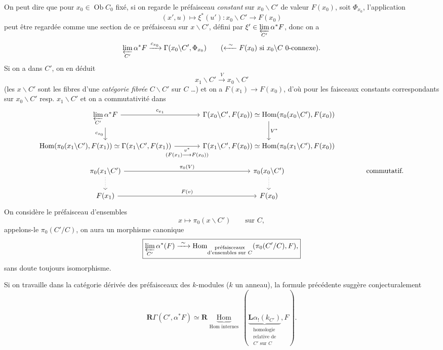 On peut dire que pour $x_0 \in \operatorname{Ob} C_0$ fixé, si on regarde le préfaisceau \textit{constant} sur $x_0\backslash C'$ de valeur $F(x_0)$, soit $\Phi_{x_0}$, l'application
\[ (x',u) \longmapsto \xi^*(u') : x_0\backslash C' \longrightarrow F(x_0) \]
peut être regardée comme une section de ce préfaisceau sur $x\backslash C'$, défini par $\xi' \in \varprojlim\limits_{C'} \alpha^*F$, donc on a
\[ \varprojlim_{C'} \alpha^*F \xrightarrow{c_{x_0}} \Gamma(x_0\backslash C', \Phi_{x_0}) \qquad (\xleftarrow{\ \sim\ } F(x_0) \text{ si } x_0\backslash C \text{ 0-connexe}). \]
Si on a  dans $C'$, on en déduit
\[ x_1\backslash C' \xrightarrow{V} x_0\backslash C' \]
(les $x\backslash C'$ sont les fibres d'une \textit{catégorie fibrée} $C\backslash C'$ sur $C$ \dots) et on a $F(x_1) \longrightarrow F(x_0)$, d'où  pour les faisceaux constants correspondants sur $x_0\backslash C'$ resp. $x_1\backslash C'$
et on a commutativité dans
\[
\begin{tikzcd}[column sep=large]
\varprojlim\limits_{C'} \alpha^*F \arrow[r, "c_{x_1}"] \arrow[d, "c_{x_0}"'] & \Gamma(x_0\backslash C', F(x_0)) \simeq \operatorname{Hom}(\pi_0(x_0\backslash C'), F(x_0)) \arrow[d, "V^*"] & \\
\operatorname{Hom}(\pi_0(x_1\backslash C'), F(x_1)) \simeq \Gamma(x_1\backslash C', F(x_1)) \arrow[r, "\substack{v^*\\ (F(x_1) \longrightarrow F(x_0))}"'] & \Gamma(x_1\backslash C', F(x_0)) \simeq \operatorname{Hom}(\pi_0(x_1\backslash C'), F(x_0)) & \\
\pi_0(x_1\backslash C') \arrow[r, "\pi_0(V)"] \arrow[d, dotted] & \pi_0(x_0\backslash C') \arrow[d, dotted] & \text{commutatif.} \\
F(x_1) \arrow[r, "F(v)"] & F(x_0) &
\end{tikzcd}
\]
On considère le préfaisceau d'ensembles
\[ x \longmapsto \pi_0(x\backslash C') \qquad \text{sur } C, \]
appelons-le $\pi_0(C'/C)$, on aura un morphisme canonique
\[ \boxed{\varprojlim_{C'} \alpha^*(F) \xrightarrow{\ \sim\ } \operatorname{Hom}_{\substack{\text{préfaisceaux}\\ \text{d'ensembles sur $C$}}} (\pi_0(C'/C), F),} \]
sans doute toujours isomorphisme.

Si on travaille dans la catégorie dérivée des préfaisceaux des $k$-modules ($k$ un anneau), la formule précédente suggère conjecturalement
\[ \boxed{\mathbf{R}\Gamma(C', \alpha^*F) \simeq \mathbf{R}\underbrace{\operatorname{Hom}}_{\text{Hom internes}}\ (\underbrace{\mathbf{L}\alpha_!(k_{C'})}_{\substack{\text{homologie}\\ \text{relative de}\\ \text{$C'$ sur $C$}}}, F).} \]


